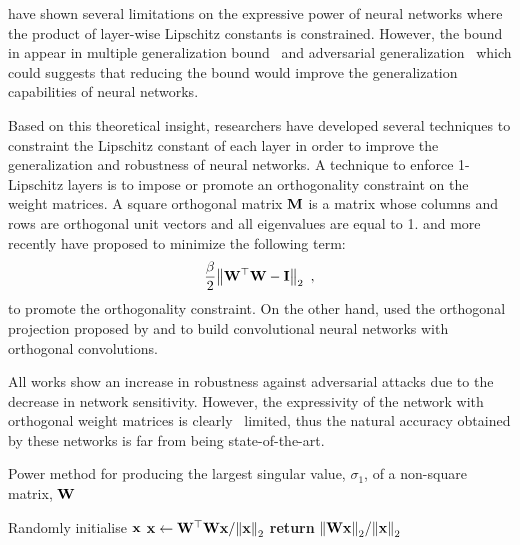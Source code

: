\noindent
\citet{huster2018limitations} have shown several limitations on the expressive power of neural networks where the product of layer-wise Lipschitz constants is constrained.
However, the bound in  appear in multiple generalization bound~\cite{neyshabur2017,bartlett2017spectrally,golowich2018} and adversarial generalization~\cite{farnia2018generalizable} which could suggests that reducing the bound would improve the generalization capabilities of neural networks.




Based on this theoretical insight, researchers have developed several techniques to constraint the Lipschitz constant of each layer in order to improve the generalization and robustness of neural networks.
A technique to enforce 1-Lipschitz layers is to impose or promote an orthogonality constraint on the weight matrices.
A square orthogonal matrix $\mathbf{M}$ is a matrix whose columns and rows are orthogonal unit vectors and all eigenvalues are equal to 1.
\citet{cisse2017parseval} and more recently \citet{wang2020orthogonal,huang2020controllable} have proposed to minimize the following term:
\begin{equation}
  \frac{\beta}{2} \norm{\mathbf{W}^\top \mathbf{W} - \mathbf{I}}_2  \enspace, 
\end{equation}
to promote the orthogonality constraint.
On the other hand, \citet{li2019preventing} used the orthogonal projection proposed by \citet{kautsky1994matrix} and \citet{xiao2018dynamical} to build convolutional neural networks with orthogonal convolutions.

All works show an increase in robustness against adversarial attacks due to the decrease in network sensitivity.
However, the expressivity of the network with orthogonal weight matrices is clearly  limited, thus the natural accuracy obtained by these networks is far from being state-of-the-art.


\begin{algorithm}[ht]
  \caption{Power method for producing the largest singular value, $\sigma_1$, of a non-square matrix, $\mathbf{W}$ \cite{gouk2018regularisation,golub2000eigenvalue}}
  \begin{algorithmic}[1]
    \State Randomly initialise $\mathbf{x}$
      \State $\mathbf{x} \gets \mathbf{W}^\top \mathbf{W} \mathbf{x} / \norm{\mathbf{x}}_2$
    \EndFor
    \State \textbf{return} $\norm{\mathbf{W} \mathbf{x}}_2 / \norm{\mathbf{x}}_2$
  \end{algorithmic}
  \label{algorithm:ch3-power_method}
\end{algorithm}

